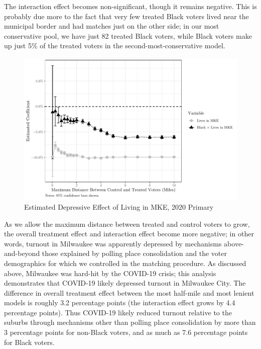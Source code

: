 \documentclass[
  12pt,
]{article}
\begin{document}
The interaction effect becomes non-significant, though it remains negative. This is probably due more to the fact that very few treated Black voters lived near the municipal border and had matches just on the other side; in our most conservative pool, we have just 82 treated Black voters, while Black voters make up just 5\% of the treated voters in the second-most-conservative model.

\begin{figure}[H]

{\centering \includegraphics{markdown_files/figure-latex/plot-1} 

}

\caption{\label{fig:coef-plot}Estimated Depressive Effect of Living in MKE, 2020 Primary}\label{fig:plot}
\end{figure}

As we allow the maximum distance between treated and control voters to grow, the overall treatment effect and interaction effect become more negative; in other words, turnout in Milwaukee was apparently depressed by mechanisms above-and-beyond those explained by polling place consolidation and the voter demographics for which we controlled in the matching procedure. As discussed above, Milwaukee was hard-hit by the COVID-19 crisis; this analysis demonstrates that COVID-19 likely depressed turnout in Milwaukee City. The difference in overall treatment effect between the most half-mile and most lenient models is roughly 3.2 percentage points (the interaction effect grows by 4.4 percentage points). Thus COVID-19 likely reduced turnout relative to the suburbs through mechanisms other than polling place consolidation by more than 3 percentage points for non-Black voters, and as much as 7.6 percentage points for Black voters.
\end{document}
